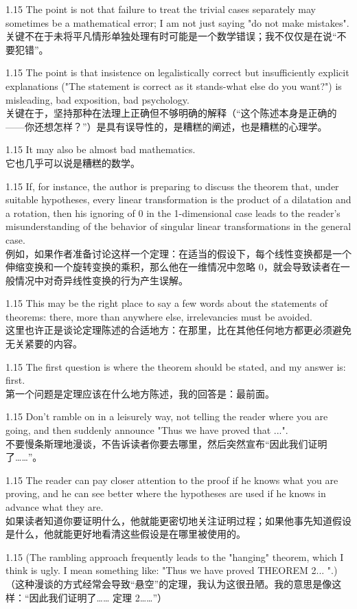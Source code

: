 \documentclass[12pt,a4paper]{article}
\newcommand{\bilingual}[2]{
    \begin{spacing}{1.15} %
        \noindent \normalsize #1 \\[-0.5ex] %
        \small \textcolor{blue!70!black}{#2} %
    \end{spacing}
    \vspace{0.8em} %
}
\begin{document}
\bilingual{The point is not that failure to treat the trivial cases separately may sometimes be a mathematical error; I am not just saying "do not make mistakes".}
{关键不在于未将平凡情形单独处理有时可能是一个数学错误；我不仅仅是在说“不要犯错”。} %

\bilingual{The point is that insistence on legalistically correct but insufficiently explicit explanations ("The statement is correct as it stands-what else do you want?") is misleading, bad exposition, bad psychology.}
{关键在于，坚持那种在法理上正确但不够明确的解释（“这个陈述本身是正确的——你还想怎样？”）是具有误导性的，是糟糕的阐述，也是糟糕的心理学。} %

\bilingual{It may also be almost bad mathematics.}
{它也几乎可以说是糟糕的数学。} %

\bilingual{If, for instance, the author is preparing to discuss the theorem that, under suitable hypotheses, every linear transformation is the product of a dilatation and a rotation, then his ignoring of 0 in the 1-dimensional case leads to the reader's misunderstanding of the behavior of singular linear transformations in the general case.}
{例如，如果作者准备讨论这样一个定理：在适当的假设下，每个线性变换都是一个伸缩变换和一个旋转变换的乘积，那么他在一维情况中忽略 0，就会导致读者在一般情况中对奇异线性变换的行为产生误解。} %

\bilingual{This may be the right place to say a few words about the statements of theorems: there, more than anywhere else, irrelevancies must be avoided.}
{这里也许正是谈论定理陈述的合适地方：在那里，比在其他任何地方都更必须避免无关紧要的内容。} %

\bilingual{The first question is where the theorem should be stated, and my answer is: first.}
{第一个问题是定理应该在什么地方陈述，我的回答是：最前面。} %

\bilingual{Don't ramble on in a leisurely way, not telling the reader where you are going, and then suddenly announce "Thus we have proved that ...".}
{不要慢条斯理地漫谈，不告诉读者你要去哪里，然后突然宣布“因此我们证明了……”。} %

\bilingual{The reader can pay closer attention to the proof if he knows what you are proving, and he can see better where the hypotheses are used if he knows in advance what they are.}
{如果读者知道你要证明什么，他就能更密切地关注证明过程；如果他事先知道假设是什么，他就能更好地看清这些假设是在哪里被使用的。} %

\bilingual{(The rambling approach frequently leads to the "hanging" theorem, which I think is ugly. I mean something like: "Thus we have proved THEOREM 2... ".)}
{（这种漫谈的方式经常会导致“悬空”的定理，我认为这很丑陋。我的意思是像这样：“因此我们证明了…… 定理 2……”）} %
\end{document}
